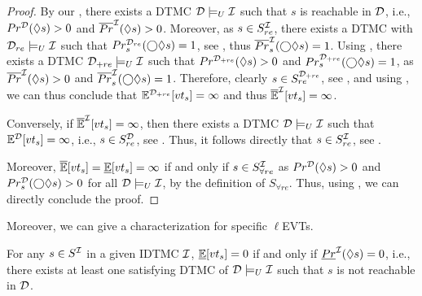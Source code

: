 \begin{proof}
    By our , there exists a DTMC $\mathcal{D} \models_U \mathcal{I}$ such that $s$ is reachable in $\mathcal{D}$, i.e., $Pr^{\mathcal{D}}(\lozenge s)>0$ and $\overline{Pr}^{\mathcal{I}}(\lozenge s) > 0$. Moreover, as $s\in S_{re}^{\mathcal{I}}$, there exists a DTMC with $\mathcal{D}_{re}\models_U \mathcal{I}$ such that $Pr^{\mathcal{D}_{re}}_s(\bigcirc\lozenge s) = 1$, see , thus $\overline{Pr}^{\mathcal{I}}_{s}(\bigcirc\lozenge s) = 1$. Using , there exists a DTMC $\mathcal{D}_{+re}\models_U\mathcal{I}$ such that $Pr^{\mathcal{D}_{+re}}(\lozenge s)>0$ and $Pr^{\mathcal{D}_{+re}}_{s}(\bigcirc\lozenge s) = 1$, as $\overline{Pr}^{\mathcal{I}}(\lozenge s) > 0$ and $\overline{Pr}^{\mathcal{I}}_{s}(\bigcirc\lozenge s) = 1$. Therefore, clearly $s\in S^{\mathcal{D}_{+re}}_{re}$, see , and using , we can thus conclude that $\mathbb{E}^{\mathcal{D}_{+re}}[vt_s] = \infty$ and thus $\mathbb{\overline{E}}^{\mathcal{I}}[vt_s] =\infty$.
    
    Conversely, if $\mathbb{\overline{E}}^{\mathcal{I}}[vt_s] =\infty$, then there exists a DTMC $\mathcal{D} \models_U \mathcal{I}$ such that $\mathbb{E}^{\mathcal{D}}[vt_s] = \infty$, i.e., $s\in S^{\mathcal{D}}_{re}$, see . Thus, it follows directly that $s\in S^{\mathcal{I}}_{re}$, see .

    Moreover, $\mathbb{\overline{E}}[vt_s] = \mathbb{\underline{E}}[vt_s] = \infty$ if and only if $s\in S^{\mathcal{I}}_{\forall re}$ as $Pr^{\mathcal{D}}(\lozenge s) > 0$ and $Pr^{\mathcal{D}}_s(\bigcirc\lozenge s) > 0$ for all $\mathcal{D} \models_U \mathcal{I}$, by the definition of $S_{\forall re}$. Thus, using , we can directly conclude the proof.
\end{proof}

Moreover, we can give a characterization for specific $\ell$EVTs.
\begin{theorem}\label{th:Characterization_Explower_0}
    For any $s\in S^{\mathcal{I}}$ in a given IDTMC $\mathcal{I}$, $\mathbb{\underline{E}}[vt_s] = 0$ if and only if $\underline{Pr}^{\mathcal{I}}(\lozenge s) = 0$, i.e., there exists at least one satisfying DTMC of $\mathcal{D} \models_U\mathcal{I}$ such that $s$ is not reachable in $\mathcal{D}$.
\end{theorem}

